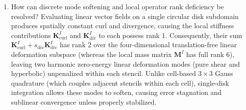 \documentclass[preprint,12pt]{elsarticle}
\begin{document}
\begin{enumerate}
    \item How can discrete mode softening and local operator rank deficiency be resolved? Evaluating linear vector fields on a single circular disk subdomain produces spatially constant curl and divergence, causing the local stiffness contributions $\mathbf{K}_{\mathrm{curl}}^I$ and $\mathbf{K}_{\mathrm{div}}^I$ to each possess rank 1. Consequently, their sum $\mathbf{K}_{\mathrm{curl}}^I + s_{\mathrm{div}}\mathbf{K}_{\mathrm{div}}^I$ has rank 2 over the four-dimensional translation-free linear deformation subspace (whereas the local mass matrix $\mathbf{M}^I$ has full rank 6), leaving two harmonic zero-energy linear deformation modes (pure shear and hyperbolic) unpenalized within each stencil. Unlike cell-based $3\times 3$ Gauss quadrature (which couples adjacent stencils within each cell), single-disk integration allows these modes to soften, causing error stagnation and sublinear convergence unless properly stabilized.
\end{enumerate}
\end{document}
